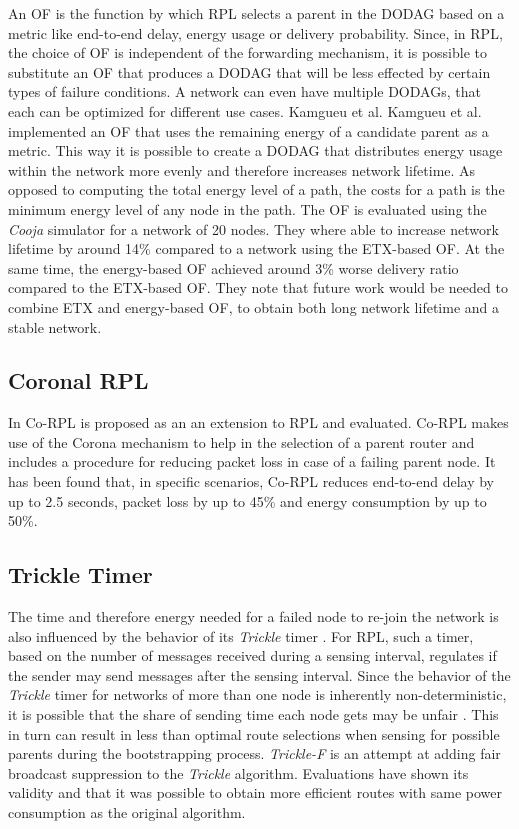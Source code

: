 An \ac{OF} is the function by which \ac{RPL} selects a parent in the \ac{DODAG} based on a metric like end-to-end delay, energy usage or delivery probability.
Since, in \ac{RPL}, the choice of \ac{OF} is independent of the forwarding mechanism, it is possible to substitute an \ac{OF} that produces a \ac{DODAG} that will be less effected by certain types of failure conditions.
A network can even have multiple \acp{DODAG}, that each can be optimized for different use cases.
Kamgueu et al. Kamgueu et al. \cite{kamgueu2013energy} implemented an \ac{OF} that uses the remaining energy of a candidate parent as a metric.
This way it is possible to create a \ac{DODAG} that distributes energy usage within the network more evenly and therefore increases network lifetime.
As opposed to computing the total energy level of a path, the costs for a path is the minimum energy level of any node in the path.
The \ac{OF} is evaluated using the \emph{Cooja} simulator for a network of 20 nodes.
They where able to increase network lifetime by around 14\% compared to a network using the \ac{ETX}-based \ac{OF}.
At the same time, the energy-based \ac{OF} achieved around 3\% worse delivery ratio compared to the \ac{ETX}-based \ac{OF}.
They note that future work would be needed to combine \ac{ETX} and energy-based \ac{OF}, to obtain both long network lifetime and a stable network.

\subsection{Coronal RPL}

In \cite{gaddour2014co} \ac{Co-RPL} is proposed as an an extension to \ac{RPL} and evaluated.
Co-\ac{RPL} makes use of the Corona mechanism \cite{olariu2006design} to help in the selection of a parent router and includes a procedure for reducing packet loss in case of a failing parent node.
It has been found that, in specific scenarios, \ac{Co-RPL} reduces end-to-end delay by up to 2.5 seconds, packet loss by up to 45\% and energy consumption by up to 50\%.

\subsection{Trickle Timer}

The time and therefore energy needed for a failed node to re-join the network is also influenced by the behavior of its \emph{Trickle} timer \cite{levis2004trickle}.
For \ac{RPL}, such a timer, based on the number of messages received during a sensing interval, regulates if the sender may send messages after the sensing interval.
Since the behavior of the \emph{Trickle} timer for networks of more than one node is inherently non-deterministic, it is possible that the share of sending time each node gets may be unfair \cite{vallati2013trickle}.
This in turn can result in less than optimal route selections when sensing for possible parents during the bootstrapping process.
\emph{Trickle-F} \cite{vallati2013trickle} is an attempt at adding fair broadcast suppression to the \emph{Trickle} algorithm.
Evaluations have shown its validity and that it was possible to obtain more efficient routes with same power consumption as the original algorithm.

